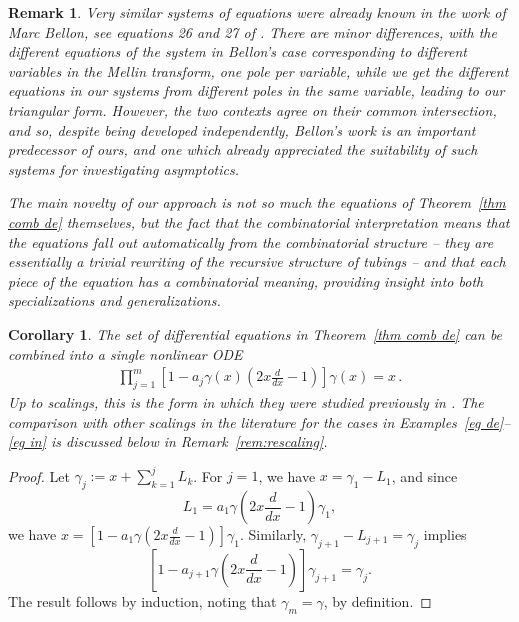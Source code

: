 \documentclass[oneside]{amsart}
\newtheorem{cor}[thm]{Corollary}
\newtheorem{remark}[thm]{Remark}
\theoremstyle{definition}
\begin{document}
\begin{remark}
Very similar systems of equations were already known in the work of Marc Bellon, see equations 26 and 27 of \cite{Befficient}. There are minor differences, with the different equations of the system in Bellon's case corresponding to different variables in the Mellin transform, one pole per variable, while we get the different equations in our systems from different poles in the same variable, leading to our triangular form. However, the two contexts agree on their common intersection, and so, despite being developed independently, Bellon's work is an important predecessor of ours, and one which already appreciated the suitability of such systems for investigating asymptotics.

The main novelty of our approach is not so much the equations of Theorem~\ref{thm comb de} themselves, but the fact that the combinatorial interpretation means that the equations fall out automatically from the combinatorial structure -- they are essentially a trivial rewriting of the recursive structure of tubings -- and that each piece of the equation has a combinatorial meaning, providing insight into both specializations and generalizations. 
\end{remark}

\begin{cor}
\label{cor:nonlinear}
The set of differential equations in Theorem~\ref{thm comb de} can be combined into a single nonlinear ODE
%
\begin{eqnarray} \prod_{j=1}^m \left[1-a_j \gamma(x)\left(2x\frac{d}{dx}-1\right)\right]\gamma(x)=x\,. \label{eq:ode} \end{eqnarray}
Up to scalings, this is the form in which they were studied previously in \cite{bkerfc,bk30,BD,BDM,BB}. The comparison with other scalings in the literature for the cases in Examples~\ref{eg de}--\ref{eg in} is discussed below in Remark~\ref{rem:rescaling}.
\end{cor}
\begin{proof}
    Let $\gamma_j:=x+\sum_{k=1}^j L_k$. For $j=1$, we have $x=\gamma_1-L_1$, and since $$L_1=a_1\gamma \left(2x\frac{d}{dx}-1\right)\gamma_1,$$ we have $x=\left[1-a_1\gamma \left(2x\frac{d}{dx}-1\right)\right]\gamma_1$. Similarly, $\gamma_{j+1}-L_{j+1}=\gamma_{j}$ implies $$\left[1-a_{j+1}\gamma \left(2x\frac{d}{dx}-1\right)\right]\gamma_{j+1}=\gamma_j.$$ The result follows by induction, noting that $\gamma_m=\gamma$,  by definition.
\end{proof}
\end{document}
